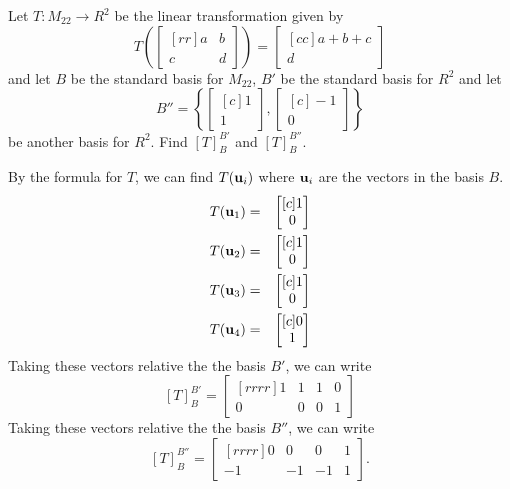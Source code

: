 \ii Let $T:M_{22} \rightarrow R^2$ be the linear transformation given by
$$
T\left(
\begin{bmatrix}[rr]
a&b\\
c&d
\end{bmatrix}
\right)
= 
\begin{bmatrix}[cc]
a+b+c\\
d
\end{bmatrix}
$$
and let $B$ be the standard basis for $M_{22}$, $B'$ be the standard basis for $R^2$ and let
$$
B'' = \left\{
\begin{bmatrix}[c]
1\\
1
\end{bmatrix},
\begin{bmatrix}[c]
-1\\
0
\end{bmatrix}
\right\}
$$
be another basis for $R^2$. Find $[T]_{B}^{B'}$ and $[T]_{B}^{B''}$.
\\
\begin{solution}
\noindent By the formula for $T$, we can find $T({\mathbf u}_i)$ where ${\mathbf u}_i$ are the vectors in the basis $B$.
\begin{eqnarray*}
T({\mathbf u}_1) &=& 
\begin{bmatrix}[c]
1\\
0
\end{bmatrix}\\
T({\mathbf u}_2) &=& 
\begin{bmatrix}[c]
1\\
0
\end{bmatrix}\\
T({\mathbf u}_3) &=& 
\begin{bmatrix}[c]
1\\
0
\end{bmatrix}\\
T({\mathbf u}_4) &=& 
\begin{bmatrix}[c]
0\\
1
\end{bmatrix}
\end{eqnarray*}
Taking these vectors relative the the basis $B'$, we can write
$$
[T]_{B}^{B'} =
\begin{bmatrix}[rrrr]
1&1&1&0\\
0&0&0&1
\end{bmatrix}
$$
Taking these vectors relative the the basis $B''$, we can write
$$
[T]_{B}^{B''} =
\begin{bmatrix}[rrrr]
0&0&0&1\\
-1&-1&-1&1
\end{bmatrix}.
$$
\end{solution}
\ee